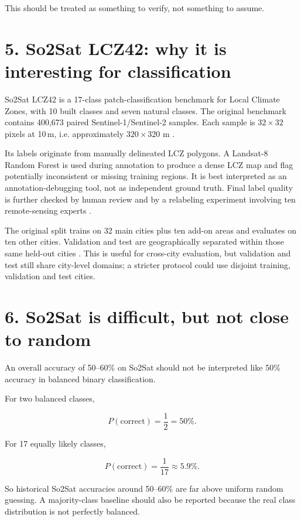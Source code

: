 \documentclass[11pt,a4paper]{article}
\begin{document}
This should be treated as something to verify, not something to assume.

\section{5. So2Sat LCZ42: why it is interesting for classification}

So2Sat LCZ42 is a 17-class patch-classification benchmark for Local Climate Zones, with 10 built
classes and seven natural classes. The original benchmark contains 400,673 paired Sentinel-1/Sentinel-2
samples. Each sample is \(32\times32\) pixels at 10\,m, i.e. approximately \(320\times320\) m
\cite{so2sat}.

Its labels originate from manually delineated LCZ polygons. A Landsat-8 Random Forest is used during
annotation to produce a dense LCZ map and flag potentially inconsistent or missing training regions.
It is best interpreted as an annotation-debugging tool, not as independent ground truth. Final label
quality is further checked by human review and by a relabeling experiment involving ten remote-sensing
experts \cite{so2sat}.

The original split trains on 32 main cities plus ten add-on areas and evaluates on ten other cities.
Validation and test are geographically separated within those same held-out cities
\cite{so2sat}. This is useful for cross-city evaluation, but validation and test still share city-level
domains; a stricter protocol could use disjoint training, validation and test cities.

\section{6. So2Sat is difficult, but not close to random}

An overall accuracy of 50--60\% on So2Sat should not be interpreted like 50\% accuracy in balanced
binary classification.

For two balanced classes,

\[
P(\mathrm{correct})=\frac{1}{2}=50\%.
\]

For 17 equally likely classes,

\[
P(\mathrm{correct})=\frac{1}{17}\approx5.9\%.
\]

So historical So2Sat accuracies around 50--60\% are far above uniform random guessing. A majority-class
baseline should also be reported because the real class distribution is not perfectly balanced.
\end{document}

